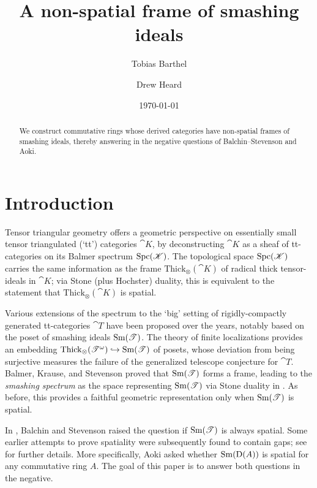 \documentclass{amsart}
\title{A non-spatial frame of smashing ideals}
\author[T.~Barthel]{Tobias Barthel}
\author[D.~Heard]{Drew Heard}
\date{\today}
\begin{document}
    \begin{abstract}
        We construct commutative rings whose derived categories have non-spatial frames of smashing ideals, thereby answering in the negative questions of Balchin--Stevenson and  Aoki.
    \end{abstract}
    \maketitle
    
    \vspace{-1em}
    \tableofcontents

    \vspace{-1em}
    \section{Introduction}

    Tensor triangular geometry offers a geometric perspective on essentially small tensor triangulated (`tt') categories $\cat K$, by deconstructing $\cat K$ as a sheaf of tt-categories on its Balmer spectrum $\operatorname{Spc}(\mathscr{K})$. The topological space $\operatorname{Spc}(\mathscr{K})$ carries the same information as the frame $\mathrm{Thick}_{\otimes}(\cat K)$ of radical thick tensor-ideals in $\cat K$; via Stone (plus Hochster) duality, this is equivalent to the statement that $\mathrm{Thick}_{\otimes}(\cat K)$ is spatial. 

    Various extensions of the spectrum to the `big' setting of rigidly-compactly generated tt-categories $\cat T$ have been proposed over the years, notably based on the poset of smashing ideals $\operatorname{Sm}(\mathscr{T})$. The theory of finite localizations provides an embedding $\mathrm{Thick}_{\otimes}(\mathscr{T}^{\omega}) \hookrightarrow \operatorname{Sm}(\mathscr{T})$ of posets, whose deviation from being surjective measures the failure of the generalized telescope conjecture for $\cat T$. Balmer, Krause, and Stevenson \cite{BalmerKrauseStevenson2020Frame} proved that $\operatorname{Sm}(\mathscr{T})$ forms a frame, leading to the \emph{smashing spectrum} as the space representing $\operatorname{Sm}(\mathscr{T})$ via Stone duality in \cite{BalchinStevenson21pp}. As before, this provides a faithful geometric representation only when $\operatorname{Sm}(\mathscr{T})$ is spatial.
    
    In \cite[page 2]{BalchinStevenson21pp}, Balchin and Stevenson raised the question if $\operatorname{Sm}(\mathscr{T})$ is always spatial. Some earlier attempts to prove spatiality were subsequently found to contain gaps; see  for further details.  More specifically, Aoki \cite[Question 1.6]{aoki2024smashing} asked whether $\operatorname{Sm}(\operatorname{D}(A))$ is spatial for any commutative ring $A$. The goal of this paper is to answer both questions in the negative.    
    
\end{document}
